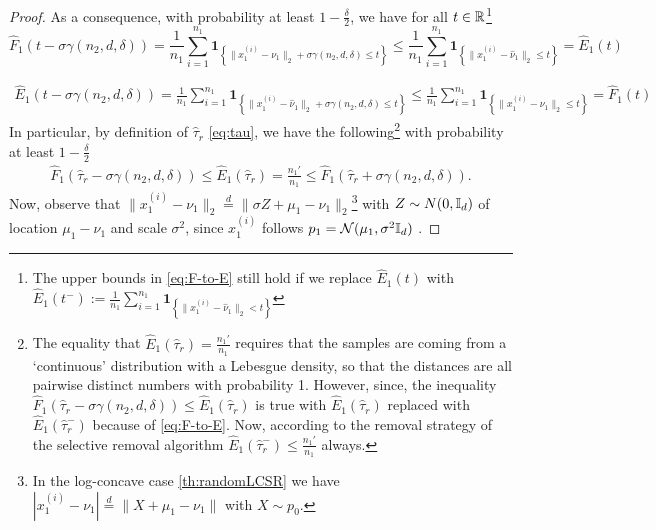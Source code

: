\begin{proof}
As a consequence, with probability at least $1-\frac{\delta}{2}$,  we have for all $t\in \mathbb{R}$\footnote{The upper bounds in \eqref{eq:F-to-E} still hold if we replace $\hat{E}_1(t)$ with $\hat{E}_1(t^-):= \frac{1}{n_1} \sum_{i=1}^{n_1} \mathbf{1}_{\left\{\|x_1^{(i)} - \hat{\nu}_1\|_2 < t \right\}} $ }
\begin{equation} \label{eq:F-to-E}
 \widehat{F}_1(t -\sigma \gamma(n_2, d, \delta)) 
 =
 \frac{1}{n_1} \sum_{i=1}^{n_1} \mathbf{1}_{\left\{ \|x_1^{(i)} - \nu_1\|_2 + \sigma \gamma(n_2, d, \delta) \leq t \right\}} 
    \leq
\frac{1}{n_1} \sum_{i=1}^{n_1} \mathbf{1}_{\left\{\|x_1^{(i)} - \hat{\nu}_1\|_2 \leq t \right\}} 
=
\widehat{E}_1(t)
\end{equation}

\begin{align}
 \widehat{E}_1(t -\sigma \gamma(n_2, d, \delta)) 
 =
 \frac{1}{n_1} \sum_{i=1}^{n_1} \mathbf{1}_{\left\{ \|x_1^{(i)} - \hat{\nu}_1\|_2 + \sigma \gamma(n_2, d, \delta) \leq t \right\}} 
    \leq
\frac{1}{n_1} \sum_{i=1}^{n_1} \mathbf{1}_{\left\{\|x_1^{(i)} - \nu_1\|_2 \leq t \right\}} 
=
\widehat{F}_1(t)
\end{align}
In particular, by definition of $\hat{\tau}_r$ \ref{eq:tau}, we have the following\footnote{The equality that $\widehat{E}_1(\hat{\tau}_r) =\frac{n_1'}{n_1}$ requires that the samples are coming from a `continuous' distribution with a Lebesgue density, so that the distances are all pairwise distinct numbers with probability 1. However, since, the inequality $\widehat{F}_1(\hat{\tau}_r - \sigma \gamma(n_2,d,\delta)) 
    \leq 
    \widehat{E}_1(\hat{\tau}_r)$ is true with $\hat{E}_1(\hat{\tau}_r)$ replaced with $\hat{E}_1(\hat{\tau}_r^-)$ because of \ref{eq:F-to-E}. Now, according to the removal strategy of the selective removal algorithm $\hat{E}_1(\hat{\tau}_r^-) \leq \frac{n_1'}{n_1}$ always.} with probability at least $1-\frac{\delta}{2}$
\begin{align} \label{eq:FtoE}
    \widehat{F}_1(\hat{\tau}_r - \sigma \gamma(n_2,d,\delta)) 
    \leq 
    \widehat{E}_1(\hat{\tau}_r)
    =
    \frac{n_1'}{n_1} \leq \widehat{F}_1(\hat{\tau}_r + \sigma \gamma(n_2,d,\delta)) .
\end{align}
Now, observe that $\|x_1^{(i)} - \nu_1\|_2 \overset{d}{=} \|\sigma Z + \mu_1- \nu_1\|_2$\footnote{In the log-concave case \ref{th:randomLCSR} we have  $|x_1^{(i)} - \nu_1| \overset{d}{=} \|X + \mu_1- \nu_1\|$ with $X\sim p_0$.} with $Z \sim N(0, \mathbb{I}_d)$ of location $\mu_1 - \nu_1$ and scale $\sigma^2$, since  $x_1^{(i)}$ follows $p_1 = \mathcal{N}(\mu_1, \sigma^2\mathbb{I}_d)$ .

\end{proof}
